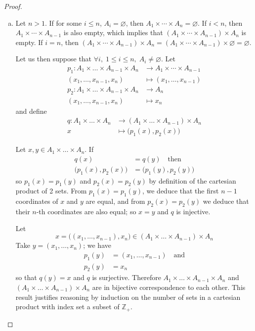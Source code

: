 \documentclass[11pt,a4paper,twoside]{article}
\theoremstyle{definition}
\begin{document}
\begin{proof}\hfill

  \begin{enumerate}[(a)]

  \item Let $n > 1$. If for some $i \leq n$, $A_i = \varnothing$, then $A_1 \times \dotsb \times A_n = \varnothing$.
    If $i < n$, then $A_1 \times \dotsb \times A_{n - 1}$ is also empty, which implies that $\left( A_1 \times \dotsb \times A_{n - 1} \right) \times A_n$ is empty.
    If $i = n$, then $\left ( A_1 \times \dotsb \times A_{n - 1} \right) \times A_n = \left( A_1 \times \dotsb \times A_{n - 1} \right) \times \varnothing = \varnothing$.

    Let us then suppose that $\forall i, \; 1 \leq i \leq n, \; A_i \neq \varnothing$. Let
    \begin{align*}
      p_1 : A_1 \times \dotso \times A_{n - 1} \times A_n &\to A_1 \times \dotsb \times A_{n - 1} \\
      (x_1, \dotsc, x_{n - 1}, x_n) &\mapsto (x_1, \dotsc, x_{n - 1}) \\
      p_2 : A_1 \times \dotso \times A_{n - 1} \times A_n &\to A_n \\
      (x_1, \dotsc, x_{n - 1}, x_n) &\mapsto x_n
    \end{align*}
    and define
    \begin{align*}
      q : A_1 \times \dotso \times A_n &\to (A_1 \times \dotso \times A_{n - 1}) \times A_n \\
      x &\mapsto \big( p_1 (x), p_2 (x) \big)
    \end{align*}

    Let $x, y \in A_1 \times \dotso \times A_n$. If
    \begin{align*}
      q (x) &= q (y) \quad\text{then} \\
      \big( p_1 (x), p_2 (x) \big) &= \big( p_1 (y), p_2 (y) \big)
    \end{align*}
    so $p_1 (x) = p_1 (y)$ and $p_2 (x) = p_2 (y)$ by definition of the cartesian product of 2 sets.
    From $p_1 (x) = p_1 (y)$, we deduce that the first $n - 1$ coordinates of $x$ and $y$ are equal, and from $p_2 (x) = p_2 (y)$
    we deduce that their $n$-th coordinates are also equal; so $x = y$ and $q$ is injective.

    Let
    \begin{equation*}
      x = \big( (x_1, \dotsc, x_{n - 1}), x_n \big) \in ( A_1 \times \dotso \times A_{n - 1} ) \times A_n
    \end{equation*}
    Take $y = (x_1, \dotsc, x_n)$; we have
    \begin{align*}
      p_1 (y) &= (x_1, \dotsc, x_{n - 1}) \quad\text{and} \\
      p_2 (y) &= x_n
    \end{align*}
    so that $q (y) = x$ and $q$ is surjective.
    Therefore $A_1 \times \dotso \times A_{n - 1} \times A_n$ and $( A_1 \times \dotso \times A_{n - 1} ) \times A_n$ are in bijective correspondence to each other.
    This result justifies reasoning by induction on the number of sets in a cartesian product with index set a subset of $\mathbb{Z}_+$.


\end{enumerate}
\end{proof}
\end{document}

